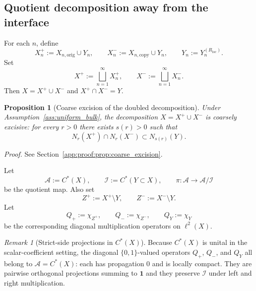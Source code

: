 \documentclass[11pt]{article}
\numberwithin{equation}{section}
\newtheorem{proposition}[theorem]{Proposition}
\theoremstyle{definition}
\theoremstyle{remark}
\newtheorem{remark}[theorem]{Remark}
\newcommand{\proofref}[1]{%
  \par\noindent\emph{Proof.} See Section~\ref{#1}.\par\medskip
}
\newcommand{\proofappendixref}[1]{\proofref{#1}}
\newcommand{\Id}{\mathbf{1}}
\begin{document}
\subsection{Quotient decomposition away from the interface}

For each $n$, define
\[
X_n^+:=X_{n,\mathrm{orig}}\cup Y_n,
\qquad
X_n^-:=X_{n,\mathrm{copy}}\cup Y_n,
\qquad
Y_n:=Y_n^{(R_{\mathrm{loc}})}.
\]
Set
\[
X^+:=\bigsqcup_{n=1}^\infty X_n^+,
\qquad
X^-:=\bigsqcup_{n=1}^\infty X_n^-.
\]
Then $X=X^+\cup X^-$ and $X^+\cap X^-=Y$.

\begin{proposition}[Coarse excision of the doubled decomposition]\label{prop:coarse_excision}
Under Assumption~\ref{ass:uniform_bulk}, the decomposition $X=X^+\cup X^-$ is coarsely
excisive: for every $r>0$ there exists $s(r)>0$ such that
\[
N_r(X^+)\cap N_r(X^-)\subset N_{s(r)}(Y).
\]
\end{proposition}
\proofappendixref{app:proof:prop:coarse_excision}




Let
\[
\mathcal A:=C^*(X),
\qquad
\mathcal I:=C^*(Y\subset X),
\qquad
\pi:\mathcal A\to \mathcal A/\mathcal I
\]
be the quotient map. Also set
\[
Z^+:=X^+\setminus Y,
\qquad
Z^-:=X^-\setminus Y.
\]
Let
\[
Q_+:=\chi_{Z^+},
\qquad
Q_-:=\chi_{Z^-},
\qquad
Q_Y:=\chi_Y
\]
be the corresponding diagonal multiplication operators on $\ell^2(X)$.

\begin{remark}[Strict-side projections in $C^*(X)$]\label{rem:strict_side_multipliers}
Because $C^*(X)$ is unital in the scalar-coefficient setting, the diagonal $\{0,1\}$-valued
operators $Q_+$, $Q_-$, and $Q_Y$ all belong to $\mathcal A=C^*(X)$: each has propagation $0$
and is locally compact. They are pairwise orthogonal projections summing to $\Id$ and they
preserve $\mathcal I$ under left and right multiplication.
\end{remark}
\end{document}

